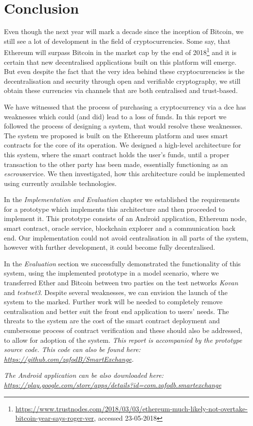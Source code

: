 \section{Conclusion}\label{sec:conclusion}

Even though the next year will mark a decade since the inception of Bitcoin, we still see a lot of development in the field of cryptocurrencies. Some say, that Ethereum will surpass Bitcoin in the market cap by the end of 2018\footnote{\url{https://www.trustnodes.com/2018/03/03/ethereum-much-likely-not-overtake-bitcoin-year-says-roger-ver}, accessed 23-05-2018} and it is certain that new decentralised applications built on this platform will emerge. But even despite the fact that the very idea behind these cryptocurrencies is the decentralisation and security through open and verifiable cryptography, we still obtain these currencies via channels that are both centralised and trust-based.

We have witnessed that the process of purchasing a cryptocurrency via a \acrshort{dce} has weaknesses which could (and did) lead to a loss of funds. In this report we followed the process of designing a system, that would resolve these weaknesses. The system we proposed is built on the Ethereum platform and uses smart contracts for the core of its operation. We designed a high-level architecture for this system, where the smart contract holds the user's funds, until a proper transaction to the other party has been made, essentially functioning as an \textit{escrow}\footnotemark service. We then investigated, how this architecture could be implemented using currently available technologies.

In the \textit{Implementation and Evaluation} chapter we established the requirements for a prototype which implements this architecture and then proceeded to implement it. This prototype consists of an Android application, Ethereum node, smart contract, oracle service, blockchain explorer and a communication back end. Our implementation could not avoid centralisation in all parts of the system, however with further development, it could become fully decentralised.
% 

In the \textit{Evaluation} section we successfully demonstrated the functionality of this system, using the implemented prototype in a model scenario, where we transferred Ether and Bitcoin between two parties on the test networks \textit{Kovan} and \textit{testnet3}. Despite several weaknesses, we can envision the launch of the system to the marked. Further work will be needed to completely remove centralisation and better suit the front end application to users' needs. The threats to the system are the cost of the smart contract deployment and cumbersome process of contract verification and these should also be addressed, to allow for adoption of the system.
\vfill
\textit{This report is accompanied by the prototype source code. This code can also be found here: \url{https://github.com/zafodB/SmartExchange}.}

\textit{The Android application can be also downloaded here: \url{https://play.google.com/store/apps/details?id=com.zafodb.smartexchange}}